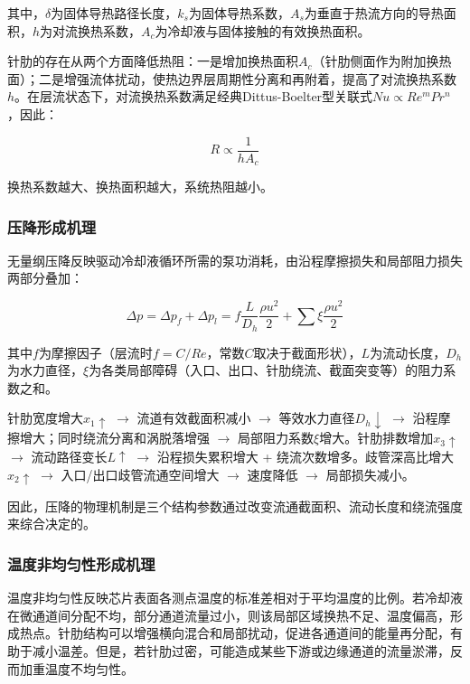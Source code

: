 \documentclass[12pt,a4paper]{ctexart}
\begin{document}
其中，$\delta$为固体导热路径长度，$k_s$为固体导热系数，$A_s$为垂直于热流方向的导热面积，$h$为对流换热系数，$A_c$为冷却液与固体接触的有效换热面积。

针肋的存在从两个方面降低热阻：一是增加换热面积$A_c$（针肋侧面作为附加换热面）；二是增强流体扰动，使热边界层周期性分离和再附着，提高了对流换热系数$h$。在层流状态下，对流换热系数满足经典Dittus-Boelter型关联式$Nu \propto Re^{m}Pr^{n}$，因此：

\begin{equation}
R \propto \frac{1}{h A_c}
\end{equation}

换热系数越大、换热面积越大，系统热阻越小。

\subsubsection{压降形成机理}

无量纲压降反映驱动冷却液循环所需的泵功消耗，由沿程摩擦损失和局部阻力损失两部分叠加：

\begin{equation}
\Delta p = \Delta p_f + \Delta p_l = f\frac{L}{D_h}\frac{\rho u^2}{2} + \sum\xi\frac{\rho u^2}{2}
\end{equation}

其中$f$为摩擦因子（层流时$f = C/Re$，常数$C$取决于截面形状），$L$为流动长度，$D_h$为水力直径，$\xi$为各类局部障碍（入口、出口、针肋绕流、截面突变等）的阻力系数之和。

针肋宽度增大$x_1 \uparrow$ $\to$ 流道有效截面积减小 $\to$ 等效水力直径$D_h \downarrow$ $\to$ 沿程摩擦增大；同时绕流分离和涡脱落增强 $\to$ 局部阻力系数$\xi$增大。针肋排数增加$x_3 \uparrow$ $\to$ 流动路径变长$L \uparrow$ $\to$ 沿程损失累积增大 + 绕流次数增多。歧管深高比增大$x_2 \uparrow$ $\to$ 入口/出口歧管流通空间增大 $\to$ 速度降低 $\to$ 局部损失减小。

因此，压降的物理机制是三个结构参数通过改变流通截面积、流动长度和绕流强度来综合决定的。

\subsubsection{温度非均匀性形成机理}

温度非均匀性反映芯片表面各测点温度的标准差相对于平均温度的比例。若冷却液在微通道间分配不均，部分通道流量过小，则该局部区域换热不足、温度偏高，形成热点。针肋结构可以增强横向混合和局部扰动，促进各通道间的能量再分配，有助于减小温差。但是，若针肋过密，可能造成某些下游或边缘通道的流量淤滞，反而加重温度不均匀性。
\end{document}

